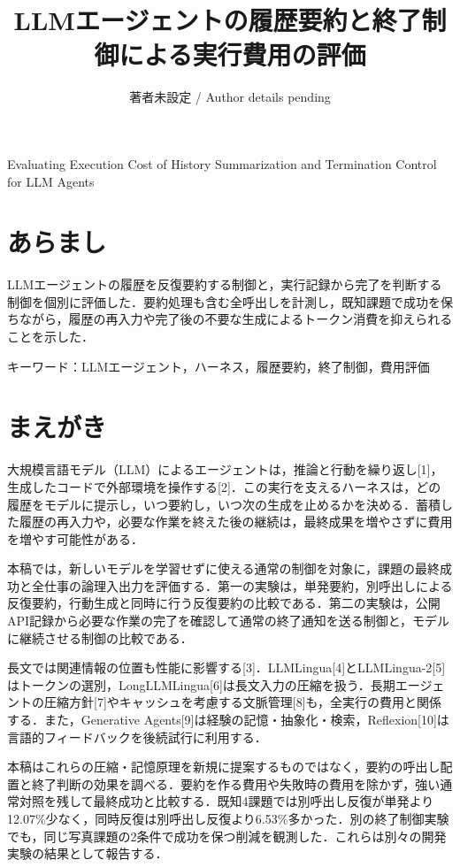 \documentclass{article}
\title{LLMエージェントの履歴要約と終了制御による実行費用の評価}
\author{著者未設定 / Author details pending}
\date{}
\begin{document}
\maketitle
Evaluating Execution Cost of History Summarization and Termination Control for LLM Agents

\section*{あらまし}
LLMエージェントの履歴を反復要約する制御と，実行記録から完了を判断する制御を個別に評価した．要約処理も含む全呼出しを計測し，既知課題で成功を保ちながら，履歴の再入力や完了後の不要な生成によるトークン消費を抑えられることを示した．

\noindent キーワード：LLMエージェント，ハーネス，履歴要約，終了制御，費用評価





\section{まえがき}
大規模言語モデル（LLM）によるエージェントは，推論と行動を繰り返し[1]，生成したコードで外部環境を操作する[2]．この実行を支えるハーネスは，どの履歴をモデルに提示し，いつ要約し，いつ次の生成を止めるかを決める．蓄積した履歴の再入力や，必要な作業を終えた後の継続は，最終成果を増やさずに費用を増やす可能性がある．

本稿では，新しいモデルを学習せずに使える通常の制御を対象に，課題の最終成功と全仕事の論理入出力を評価する．第一の実験は，単発要約，別呼出しによる反復要約，行動生成と同時に行う反復要約の比較である．第二の実験は，公開API記録から必要な作業の完了を確認して通常の終了通知を送る制御と，モデルに継続させる制御の比較である．

長文では関連情報の位置も性能に影響する[3]．LLMLingua[4]とLLMLingua-2[5]はトークンの選別，LongLLMLingua[6]は長文入力の圧縮を扱う．長期エージェントの圧縮方針[7]やキャッシュを考慮する文脈管理[8]も，全実行の費用と関係する．また，Generative Agents[9]は経験の記憶・抽象化・検索，Reflexion[10]は言語的フィードバックを後続試行に利用する．

本稿はこれらの圧縮・記憶原理を新規に提案するものではなく，要約の呼出し配置と終了判断の効果を調べる．要約を作る費用や失敗時の費用を除かず，強い通常対照を残して最終成功と比較する．既知4課題では別呼出し反復が単発より12.07\%少なく，同時反復は別呼出し反復より6.53\%多かった．別の終了制御実験でも，同じ写真課題の2条件で成功を保つ削減を観測した．これらは別々の開発実験の結果として報告する．
\end{document}
